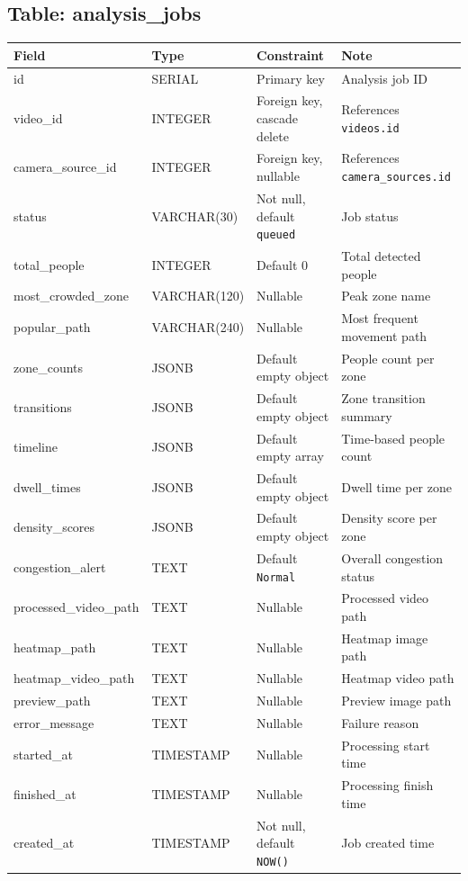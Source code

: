 \documentclass[12pt,a4paper]{report}
\begin{document}
{\subsection{Table: analysis\_jobs}
\begin{longtable}{|p{3.6cm}|p{3cm}|p{4.2cm}|p{4.5cm}|}
\hline
\rowcolor{HeaderBlue}
\textbf{Field} & \textbf{Type} & \textbf{Constraint} & \textbf{Note} \\
\hline
id & SERIAL & Primary key & Analysis job ID \\
\hline
video\_id & INTEGER & Foreign key, cascade delete & References \texttt{videos.id} \\
\hline
camera\_source\_id & INTEGER & Foreign key, nullable & References \texttt{camera\_sources.id} \\
\hline
status & VARCHAR(30) & Not null, default \texttt{queued} & Job status \\
\hline
total\_people & INTEGER & Default 0 & Total detected people \\
\hline
most\_crowded\_zone & VARCHAR(120) & Nullable & Peak zone name \\
\hline
popular\_path & VARCHAR(240) & Nullable & Most frequent movement path \\
\hline
zone\_counts & JSONB & Default empty object & People count per zone \\
\hline
transitions & JSONB & Default empty object & Zone transition summary \\
\hline
timeline & JSONB & Default empty array & Time-based people count \\
\hline
dwell\_times & JSONB & Default empty object & Dwell time per zone \\
\hline
density\_scores & JSONB & Default empty object & Density score per zone \\
\hline
congestion\_alert & TEXT & Default \texttt{Normal} & Overall congestion status \\
\hline
processed\_video\_path & TEXT & Nullable & Processed video path \\
\hline
heatmap\_path & TEXT & Nullable & Heatmap image path \\
\hline
heatmap\_video\_path & TEXT & Nullable & Heatmap video path \\
\hline
preview\_path & TEXT & Nullable & Preview image path \\
\hline
error\_message & TEXT & Nullable & Failure reason \\
\hline
started\_at & TIMESTAMP & Nullable & Processing start time \\
\hline
finished\_at & TIMESTAMP & Nullable & Processing finish time \\
\hline
created\_at & TIMESTAMP & Not null, default \texttt{NOW()} & Job created time \\
\hline
\end{longtable}
}
\end{document}
